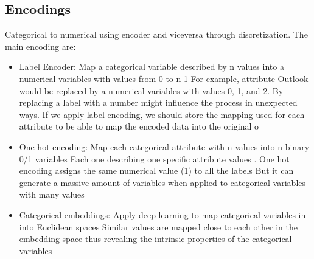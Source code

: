 \subsection{Encodings}
Categorical to numerical using encoder and viceversa through discretization. 
The main encoding are: 
\begin{itemize}
    \item Label Encoder: 
Map a categorical variable described by n values
into a numerical variables with values from 0 to n-1
For example, attribute Outlook would be replaced by a numerical
variables with values 0, 1, and 2. By replacing a label with a number might
influence the process in unexpected ways. If we apply label encoding, we should store the mapping used
for each attribute to be able to map the encoded data into the original o
    \item One hot encoding: Map each categorical attribute with
n values into n binary 0/1 variables
Each one describing one
specific attribute values
. One hot encoding assigns the same
numerical value (1) to all the labels
But it can generate a massive amount of variables
when applied to categorical variables with many values
    \item Categorical embeddings: Apply deep learning to map categorical variables
in into Euclidean spaces
Similar values are mapped close to each other
in the embedding space thus revealing the intrinsic
properties of the categorical variables

\end{itemize}